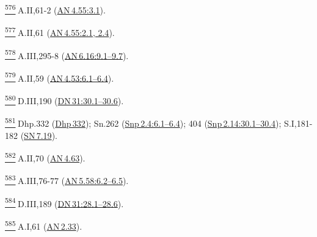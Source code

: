 \label{footprints_split_025.html_fn576}
\hyperref[footprints_split_015.htmlux5cux23fnref576]{\textsuperscript{576}} A.II,61-2
(\href{https://suttacentral.net/an4.55/en/sujato\#3.1}{AN\,4.55:3.1}).

\label{footprints_split_025.html_fn577}
\hyperref[footprints_split_015.htmlux5cux23fnref577]{\textsuperscript{577}} A.II,61
(\href{https://suttacentral.net/an4.55/en/sujato\#2.1}{AN\,4.55:2.1,
2.4}).

\label{footprints_split_025.html_fn578}
\hyperref[footprints_split_015.htmlux5cux23fnref578]{\textsuperscript{578}} A.III,295-8
(\href{https://suttacentral.net/an6.16/en/sujato\#9.1}{AN\,6.16:9.1--9.7}).

\label{footprints_split_025.html_fn579}
\hyperref[footprints_split_015.htmlux5cux23fnref579]{\textsuperscript{579}} A.II,59
(\href{https://suttacentral.net/an4.53/en/sujato\#6.1}{AN\,4.53:6.1--6.4}).

\label{footprints_split_025.html_fn580}
\hyperref[footprints_split_015.htmlux5cux23fnref580]{\textsuperscript{580}} D.III,190
(\href{https://suttacentral.net/dn31/en/sujato\#30.1}{DN\,31:30.1--30.6}).

\label{footprints_split_025.html_fn581}
\hyperref[footprints_split_015.htmlux5cux23fnref581]{\textsuperscript{581}} Dhp.332
(\href{https://suttacentral.net/dhp332/en/sujato}{Dhp\,332}); Sn.262
(\href{https://suttacentral.net/snp2.4/en/sujato\#6.1}{Snp\,2.4:6.1--6.4});
404
(\href{https://suttacentral.net/snp2.14/en/sujato\#30.1}{Snp\,2.14:30.1--30.4});
S.I,181-182
(\href{https://suttacentral.net/sn7.19/en/sujato}{SN\,7.19}).

\label{footprints_split_025.html_fn582}
\hyperref[footprints_split_015.htmlux5cux23fnref582]{\textsuperscript{582}} A.II,70
(\href{https://suttacentral.net/an4.63/en/sujato}{AN\,4.63}).

\label{footprints_split_025.html_fn583}
\hyperref[footprints_split_015.htmlux5cux23fnref583]{\textsuperscript{583}} A.III,76-77
(\href{https://suttacentral.net/an5.58/en/sujato\#6.2}{AN\,5.58:6.2--6.5}).

\label{footprints_split_025.html_fn584}
\hyperref[footprints_split_015.htmlux5cux23fnref584]{\textsuperscript{584}} D.III,189
(\href{https://suttacentral.net/dn31/en/sujato\#28.1}{DN\,31:28.1--28.6}).

\label{footprints_split_025.html_fn585}
\hyperref[footprints_split_015.htmlux5cux23fnref585]{\textsuperscript{585}} A.I,61
(\href{https://suttacentral.net/an2.33/en/sujato}{AN\,2.33}).


